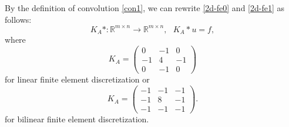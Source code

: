 By the definition of convolution \eqref{con1}, we can rewrite \eqref{2d-fe0} and \eqref{2d-fe1} as follows: 
\begin{equation}
K_A\ast:  \mathbb{R}^{m\times n}\rightarrow \mathbb{R}^{m\times n},~~~K_A\ast u=f, 
\end{equation}
where 
\begin{equation}\label{fe0_Ka}
	K_A=
	\begin{pmatrix}
	0 &-1&0\\
	-1& 4&-1\\
	0 &-1& 0
	\end{pmatrix}
	\end{equation}
for linear finite element discretization or	
	\begin{equation}\label{fe1_Ka}
	K_A=
	\begin{pmatrix}
	-1 &-1&-1\\
	-1& 8&-1\\
	-1 &-1& -1
	\end{pmatrix}.
	\end{equation}
for bilinear finite element discretization.


